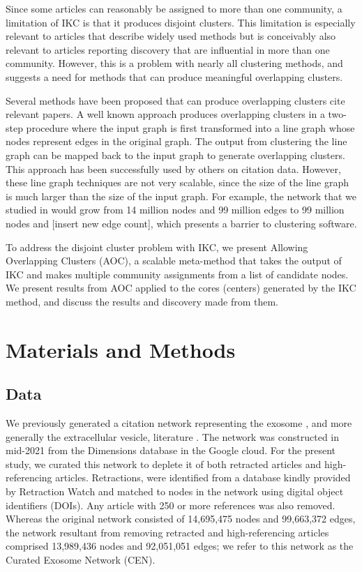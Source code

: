 \documentclass[11pt, oneside]{article}   	%
\begin{document}
Since some articles can reasonably be assigned to more than one community, a limitation of IKC is that  it produces disjoint clusters. This limitation is especially relevant to articles that describe widely used methods but is conceivably also relevant to articles reporting discovery that are influential in more than one community.   However, this is a problem with nearly all clustering methods, and suggests a need for methods that can produce meaningful overlapping clusters. 

Several methods have been proposed that can produce overlapping clusters cite relevant papers. A well known approach produces overlapping clusters  in a two-step procedure where the input graph is first transformed into a line graph \citep{Harary1960} whose nodes represent edges in the original graph.  The output from clustering the line graph can be mapped back to the input graph to generate overlapping clusters. This approach has been successfully used by others \citep{Evans2009,Havemann2021} on citation data. However, these line graph  techniques are not very scalable, since the size of the line graph is much larger than the size of the input graph. For example, the network that we studied in \cite{Wedell2022} would grow from 14 million nodes and 99 million edges to 99 million nodes and [insert new edge count], which presents a barrier to clustering software.
 
 To address the disjoint cluster problem with IKC, we present Allowing Overlapping Clusters (AOC), a scalable meta-method that takes the output of IKC and makes multiple community assignments from a list of candidate nodes. We present results from AOC applied to the cores (centers) generated by the IKC method, and discuss the results and discovery made from them.
 
\section{Materials and Methods}

\subsection{Data} We previously generated a citation network \citep{Wedell2022} representing the exosome \citep{harding1983}, and more generally the extracellular vesicle, literature \citep{raposo2021}. The network was constructed in mid-2021 from the Dimensions database \citep{hook2018dimensions} in the Google cloud. For the present study, we curated this network to deplete it of both retracted articles and high-referencing articles. Retractions, were identified from a database kindly provided by Retraction Watch and matched to nodes in the network using digital object identifiers (DOIs). Any article with 250 or more references was also removed. Whereas the original network consisted of 14,695,475 nodes and 99,663,372 edges, the network resultant from removing retracted and high-referencing articles comprised 13,989,436 nodes and 92,051,051 edges; we refer to this network as   the Curated Exosome Network (CEN).
\end{document}

